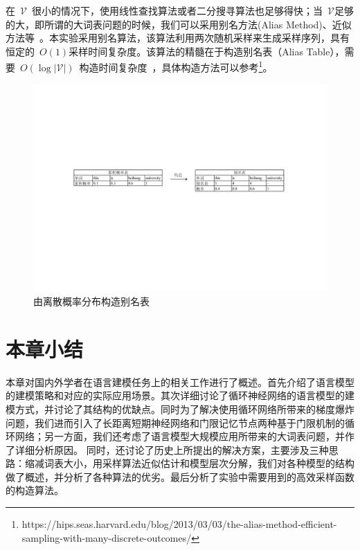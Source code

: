 在~$\mathcal{V}$~很小的情况下，使用线性查找算法或者二分搜寻算法也足够得快；当~$\mathcal{V}$足够的大，即所谓的大词表问题的时候，我们可以采用别名方法(Alias Method)、近似方法等~。本实验采用别名算法，该算法利用两次随机采样来生成采样序列，具有恒定的~$O(1)$采样时间复杂度。该算法的精髓在于构造别名表（Alias Table），需要~$O(\log |\mathcal{V}|)$~构造时间复杂度~，具体构造方法可以参考\footnote{https://hips.seas.harvard.edu/blog/2013/03/03/the-alias-method-efficient-sampling-with-many-discrete-outcomes/}。

\begin{figure}[!t]
  \centering
\includegraphics[width=1\linewidth]{./figures/alias.pdf}
\caption{由离散概率分布构造别名表}\label{fig:alias}
\end{figure}

\section{本章小结}
本章对国内外学者在语言建模任务上的相关工作进行了概述。首先介绍了语言模型的建模策略和对应的实际应用场景。其次详细讨论了循环神经网络的语言模型的建模方式，并讨论了其结构的优缺点。同时为了解决使用循环网络所带来的梯度爆炸问题，我们进而引入了长距离短期神经网络和门限记忆节点两种基于门限机制的循环网络；另一方面，我们还考虑了语言模型大规模应用所带来的大词表问题，并作了详细分析原因。
同时，还讨论了历史上所提出的解决方案，主要涉及三种思路：缩减词表大小，用采样算法近似估计和模型层次分解，我们对各种模型的结构做了概述，并分析了各种算法的优劣。最后分析了实验中需要用到的高效采样函数的构造算法。